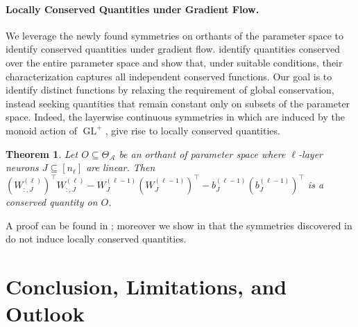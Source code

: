 \documentclass{article}
\newtheorem{theorem}{Theorem}
\theoremstyle{definition}
\newcommand{\architecture}{\mathcal{A}}
\newcommand{\paramspace}[1]{\Theta_{#1}}
\newcommand{\weights}[1]{W^{(#1)}}
\newcommand{\bias}[1]{b^{(#1)}}
\DeclareMathOperator{\GL}{GL}
\begin{document}
 
\paragraph{Locally Conserved Quantities under Gradient Flow.} 

We leverage the newly found symmetries on   orthants of the parameter space to identify conserved quantities 
under gradient flow. 
%
\cite{marcotte2023abide} identify quantities 
conserved over the entire parameter space and show that, under suitable conditions, their characterization captures all independent conserved functions. 
Our goal is to identify distinct functions by relaxing the requirement of global conservation, 
instead seeking quantities that remain constant only on subsets of the parameter space. 
Indeed, the 
layerwise continuous symmetries in 
which are induced by the monoid action of $\GL^+$, give rise to locally conserved quantities. 



\begin{theorem}\label{th:locally_conserved}
    Let $O\subseteq \paramspace{\architecture}$ be an orthant of parameter space where $\ell$-layer neurons $J \subseteq [n_\ell]$ are linear. 
    Then  $(\weights{\ell}_{:,J})^\top\weights{\ell}_{:,J}  - \weights{\ell-1}_{J}(\weights{\ell-1}_{J})^\top-\bias{\ell-1}_J (\bias{\ell-1}_J)^\top$ is a conserved quantity on $O$. 
\end{theorem}

A proof can be found in ; moreover we show in 
 that the symmetries discovered in  do not induce locally conserved quantities. 


\section{Conclusion, Limitations, and Outlook}
\end{document}

